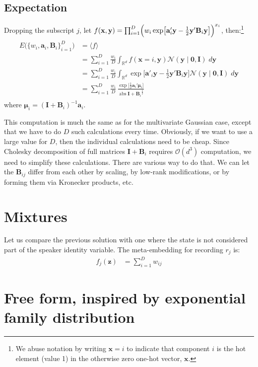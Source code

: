 \documentclass[a4paper,oneside,12pt,english]{report}
\def\zvec{\mathbf{z}}
\def\ND{\mathcal{N}}
\DeclareMathOperator{\abs}{abs}
\def\expv#1#2{\bigl\langle#1\bigr\rangle_{#2}}
\def\R{\mathbb{R}}
\def\Bmat{\mathbf{B}}
\def\Imat{\mathbf{I}}
\def\yvec{\mathbf{y}}
\def\xvec{\mathbf{x}}
\def\muvec{\boldsymbol{\mu}}
\def\avec{\mathbf{a}}
\def\nulvec{\boldsymbol{0}}
\begin{document}
\subsection{Expectation}
\def\Oset{\mathcal{O}}
Dropping the subscript $j$, let $f(\xvec,\yvec) = \prod_{i=1}^D \Bigl(w_i\exp\bigl[\avec'_i\yvec-\frac12\yvec'\Bmat_i\yvec\bigr]\Bigr)^{x_i}$, then:\footnote{We abuse notation by writing $\xvec=i$ to indicate that component $i$ is the hot element (value 1) in the otherwise zero one-hot vector, $\xvec$.}
\begin{align}
\begin{split}
E\bigl(\{w_i,\avec_i,\Bmat_i\}_{i=1}^D\bigr) &= \expv{f}{} \\
&= \sum_{i=1}^D \frac{w_i}{D} \int_{\R^d} f(\xvec=i,\yvec) \ND(\yvec\mid\nulvec,\Imat)\;d\yvec  \\
&= \sum_{i=1}^D \frac{w_i}{D} \int_{\R^d} \exp\bigl[\avec'_i\yvec-\frac12\yvec'\Bmat_i\yvec\bigr] \ND(\yvec\mid\nulvec,\Imat)\;d\yvec  \\
&= \sum_{i=1}^D \frac{w_i}{D} \,\frac{\exp\bigl[\frac12\avec_i'\muvec_i\bigr]}{\abs{\Imat+\Bmat_i}^{\frac12}} 
\end{split}
\end{align}
where $\muvec_i=(\Imat+\Bmat_i)^{-1}\avec_i$. 

This computation is much the same as for the multivariate Gaussian case, except that we have to do $D$ such calculations every time. Obviously, if we want to use a large value for $D$, then the individual calculations need to be cheap. Since Cholesky decomposition of full matrices $\Imat+\Bmat_i$ requires $\Oset(d^3)$ computation, we need to simplify these calculations. There are various way to do that. We can let the $\Bmat_{ij}$ differ from each other by scaling, by low-rank modifications, or by forming them via Kronecker products, etc.


\section{Mixtures}
Let us compare the previous solution with one where the state is not considered part of the speaker identity variable. The meta-embedding for recording $r_j$ is:
\begin{align}
f_j(\zvec) &= \sum_{i=1}^D w_{ij} 
\end{align}



\section{Free form, inspired by exponential family distribution}
\end{document}
